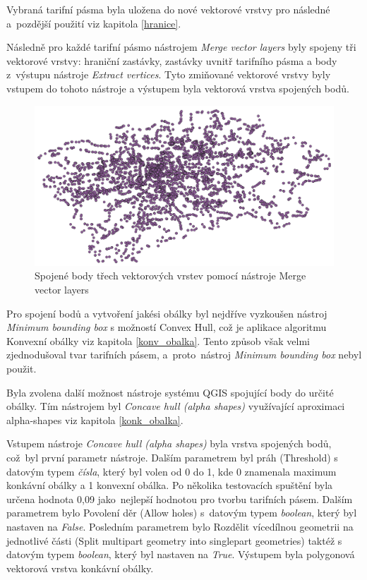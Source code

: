 Vybraná tarifní pásma byla uložena do nové vektorové vrstvy pro následné a~pozdější použití viz kapitola \ref{hranice}.

Následně pro každé tarifní pásmo nástrojem \textit{Merge vector layers} byly spojeny tři vektorové vrstvy: hraniční zastávky, 
zastávky uvnitř tarifního pásma a body z~výstupu nástroje \textit{Extract vertices}.
Tyto zmiňované vektorové vrstvy byly vstupem do tohoto nástroje a výstupem byla 
vektorová vrstva spojených bodů. 

\begin{figure}[H] \centering
    \includegraphics[width=400pt]{./pictures/merged-P0B.png}
    \caption[Spojené body třech vektorových vrstev pomocí nástroje Merge vector layers]{Spojené body třech vektorových vrstev pomocí nástroje Merge vector layers}
	\label{fig:merged-P0B}              
\end{figure} 

Pro spojení bodů a vytvoření jakési obálky byl nejdříve vyzkoušen nástroj \textit{Mi\-nimum bounding box} s možností Convex Hull,
což je aplikace algoritmu Konvexní obálky viz kapitola \ref{konv_obalka}. Tento způsob však velmi zjednodušoval tvar
tarifních pásem, a~proto~nástroj \textit{Minimum bounding box} nebyl použit.

Byla zvolena další možnost nástroje systému QGIS spojující body do určité obálky. Tím nástrojem byl \textit{Concave hull (alpha shapes)} 
využívající aproximaci alpha-shapes viz kapitola \ref{konk_obalka}.

Vstupem nástroje \textit{Concave hull (alpha shapes)} byla vrstva spojených bodů, což~byl první parametr
nástroje. Dalším parametrem byl práh (Threshold) s datovým typem \textit{čísla}, který byl volen od 0 do 1,
kde 0 znamenala maximum konkávní obálky a 1 konvexní obálka. Po několika testovacích spuštění byla 
určena hodnota 0,09 jako~nej\-lepší hodnotou pro tvorbu tarifních pásem. Dalším parametrem bylo Povolení děr (Allow holes) 
s~datovým typem \textit{boolean}, který byl nastaven na \textit{False}.
Posledním parametrem bylo Rozdělit vícedílnou geometrii na jednotlivé části (Split multipart geometry 
into singlepart geometries) taktéž s datovým typem \textit{boolean}, který byl nastaven na \textit{True}.  
Výstupem byla polygonová vektorová vrstva konkávní obálky. 

